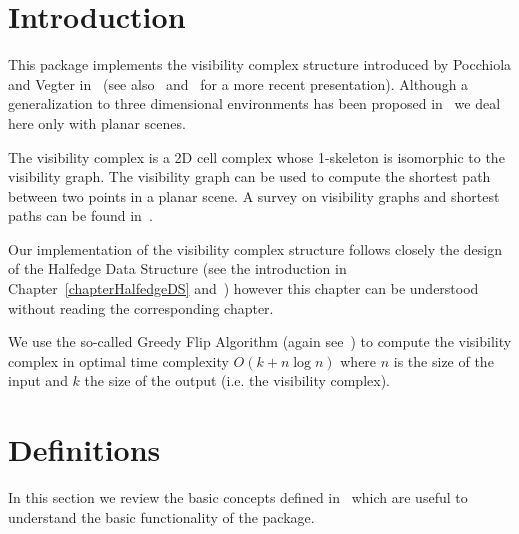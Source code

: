 
\ccParDims

\label{chapterVisibilityComplex2}

\minitoc

\section{Introduction}
\label{sectionVComplexIntroduction}
This package implements the visibility complex structure introduced by
Pocchiola and Vegter in~\cite{pv-vc-96} (see also~\cite{pv-tsvcpt-96}
and~\cite{ap-sstvc-01} for a more recent presentation). Although a
generalization to three dimensional environments has been proposed
in~\cite{ddp-fahrgv-99} we deal here only with planar scenes.

The visibility complex is a 2D cell complex whose 1-skeleton is isomorphic to
the visibility graph.  The visibility graph can be used to compute the shortest
path between two points in a planar scene. A survey on visibility graphs and
shortest paths can be found in~\cite{m-gspno-00}.

Our implementation of the visibility complex structure follows closely the
design of the Halfedge Data Structure (see the introduction in
Chapter~\ref{chapterHalfedgeDS} and~\cite{k-ugpdd-99}) however this chapter
can be understood without reading the corresponding chapter.

We use the so-called Greedy Flip Algorithm (again see~\cite{pv-tsvcpt-96})
to compute the visibility complex in optimal time complexity $O(k + n\log
n)$ where $n$ is the size of the input and $k$ the size of the output
(i.e. the visibility complex).
\section{Definitions}
In this section we review the basic concepts defined in~\cite{ap-sstvc-01}
which are useful to understand the basic functionality of the package.


